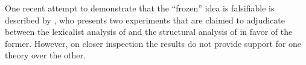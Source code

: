 
%			



One recent attempt to demonstrate that the ``frozen'' idea is falsifiable is described by \cite{fadlon12}, who presents two experiments that are claimed to adjudicate between the lexicalist analysis of \cite{reinhartsiloni05} and the structural analysis of \cite{arad05} in favor of the former. However, on closer inspection the results do not provide support for one theory over the other.

